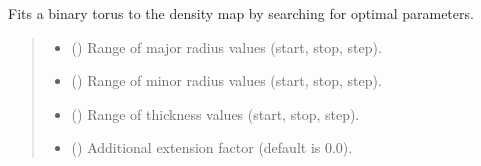 \documentclass[letterpaper,10pt,english]{sphinxmanual}
\begin{document}
\begin{fulllineitems}
\begin{fulllineitems}
\label{\detokenize{src:src.BagelFitter.BagelFitter.fit_binary_torus}}
\pysigstartsignatures
{}
\pysigstopsignatures
\sphinxAtStartPar
Fits a binary torus to the density map by searching for optimal parameters.
\begin{quote}\begin{description}
\begin{itemize}
\item {} 
\sphinxAtStartPar
{} (\sphinxstyleliteralemphasis{\sphinxupquote{, }}) \textendash{} Range of major radius values (start, stop, step).

\item {} 
\sphinxAtStartPar
{} (\sphinxstyleliteralemphasis{\sphinxupquote{, }}) \textendash{} Range of minor radius values (start, stop, step).

\item {} 
\sphinxAtStartPar
{} (\sphinxstyleliteralemphasis{\sphinxupquote{, }}) \textendash{} Range of thickness values (start, stop, step).

\item {} 
\sphinxAtStartPar
{} (\sphinxstyleliteralemphasis{\sphinxupquote{, }}) \textendash{} Additional extension factor (default is 0.0).


\end{itemize}
\end{description}
\end{quote}
\end{fulllineitems}
\end{fulllineitems}
\end{document}
